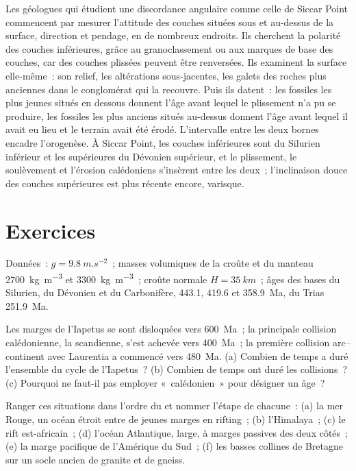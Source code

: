 \begin{inthefield}
Les géologues qui étudient une discordance angulaire comme celle de Siccar Point commencent par mesurer
l'attitude des couches situées sous et au-dessus de la surface, direction et pendage, en de nombreux endroits. Ils cherchent
la polarité des couches inférieures, grâce au granoclassement ou aux marques de base des couches,
car des couches plissées peuvent être renversées. Ils examinent la surface elle-même~: son relief, les
altérations sous-jacentes, les galets des roches plus anciennes dans le conglomérat qui la recouvre. Puis ils
datent~: les fossiles les plus jeunes situés en dessous donnent l'âge avant lequel le plissement n'a pu se produire,
les fossiles les plus anciens situés au-dessus donnent l'âge avant lequel il avait eu lieu et le terrain avait été
érodé. L'intervalle entre les deux bornes encadre l'orogenèse. À Siccar Point, les couches inférieures sont du
Silurien inférieur et les supérieures du Dévonien supérieur, et le plissement, le soulèvement et l'érosion calédoniens
s'insèrent entre les deux~; l'inclinaison douce des couches supérieures est plus récente encore, varisque.
\end{inthefield}

\section*{Exercices}\label{sec:b2:wilson-cycle:exercises}

Données~: $g = \qty{9.8}{m.s^{-2}}$~; masses volumiques de la croûte et du manteau
\qty{2700}{kg.m^{-3}} et \qty{3300}{kg.m^{-3}}~; croûte normale $H = \qty{35}{km}$~; âges des
bases du Silurien, du Dévonien et du Carbonifère, 443.1, 419.6 et \qty{358.9}{Ma}, du
Trias \qty{251.9}{Ma}.

\begin{exercise}[$\star$]\label{exo:b2:wilson-cycle:1}
Les marges de l'Iapetus se sont disloquées vers \qty{600}{Ma}~; la principale collision calédonienne, la
scandienne, s'est achevée vers \qty{400}{Ma}~; la première collision arc--continent avec Laurentia a commencé
vers \qty{480}{Ma}. (a) Combien de temps a duré l'ensemble du cycle de l'Iapetus~? (b) Combien de temps ont duré les
collisions~? (c) Pourquoi ne faut-il pas employer «~calédonien~» pour désigner un âge~?
\end{exercise}

\begin{exercise}[$\star$]\label{exo:b2:wilson-cycle:2}
Ranger ces situations dans l'ordre du  et nommer l'étape de chacune~: (a) la mer Rouge,
un océan étroit entre de jeunes marges en rifting~; (b) l'Himalaya~; (c) le
rift est-africain~; (d) l'océan Atlantique, large, à marges passives des deux côtés~; (e) la marge pacifique
de l'Amérique du Sud~; (f) les basses collines de Bretagne sur un socle ancien de granite et de gneiss.
\end{exercise}

